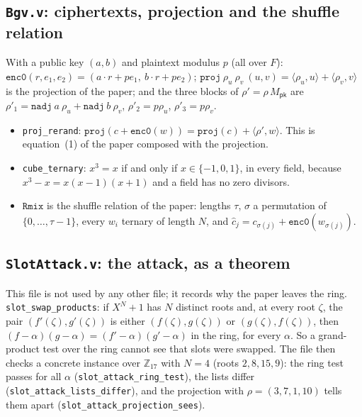 \documentclass[11pt,a4paper]{article}
\newcommand{\Mpk}{M_{\mathsf{pk}}}
\newcommand{\ip}[2]{\langle #1, #2\rangle}
\theoremstyle{definition}
\theoremstyle{plain}
\begin{document}
\subsection{\texttt{Bgv.v}: ciphertexts, projection and the shuffle relation}

With a public key $(a,b)$ and plaintext modulus $p$ (all over $F$):
$\mathtt{enc0}(r,e_1,e_2)=(a\cdot r+pe_1,\ b\cdot r+pe_2)$; $\mathtt{proj}\ \rho_u\ \rho_v\ (u,v)=
\ip{\rho_u}{u}+\ip{\rho_v}{v}$ is the projection of the paper; and the three blocks of
$\rho'=\rho\,\Mpk$ are $\rho'_1=\mathtt{nadj}\ a\ \rho_u+\mathtt{nadj}\ b\ \rho_v$, $\rho'_2=p\rho_u$,
$\rho'_3=p\rho_v$.
\begin{itemize}[leftmargin=1.3em]
\item \texttt{proj\_rerand}: $\mathtt{proj}(c+\mathtt{enc0}(w))=\mathtt{proj}(c)+\ip{\rho'}{w}$. This is
  equation~(1) of the paper composed with the projection.
\item \texttt{cube\_ternary}: $x^3=x$ if and only if $x\in\{-1,0,1\}$, in every field, because
  $x^3-x=x(x-1)(x+1)$ and a field has no zero divisors.
\item $\mathtt{Rmix}$ is the shuffle relation of the paper: lengths $\tau$, $\sigma$ a permutation of
  $\{0,\dots,\tau-1\}$, every $w_i$ ternary of length $N$, and $\hat c_j=c_{\sigma(j)}+\mathtt{enc0}(w_{\sigma(j)})$.
\end{itemize}

\subsection{\texttt{SlotAttack.v}: the attack, as a theorem}

This file is not used by any other file; it records why the paper leaves the ring.
\texttt{slot\_swap\_products}: if $X^N+1$ has $N$ distinct roots and, at every root $\zeta$, the pair
$(f'(\zeta),g'(\zeta))$ is either $(f(\zeta),g(\zeta))$ or $(g(\zeta),f(\zeta))$, then
$(f-\alpha)(g-\alpha)=(f'-\alpha)(g'-\alpha)$ in the ring, for every $\alpha$. So a grand-product test
over the ring cannot see that slots were swapped. The file then checks a concrete instance over
$\mathbb{Z}_{17}$ with $N=4$ (roots $2,8,15,9$): the ring test passes for all $\alpha$
(\texttt{slot\_attack\_ring\_test}), the lists differ (\texttt{slot\_attack\_lists\_differ}), and the
projection with $\rho=(3,7,1,10)$ tells them apart (\texttt{slot\_attack\_projection\_sees}).

\end{document}
